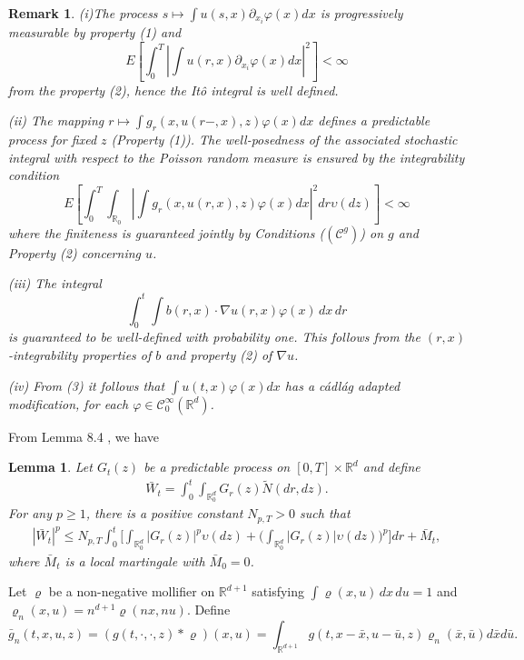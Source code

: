 \documentclass[12pt,oneside, reqno]{amsart}
\newcommand{\ce}{\begin{eqnarray*}}
\newcommand{\de}{\end{eqnarray*}}
\newtheorem{lemma}[theorem]{Lemma}
\newtheorem{remark}[theorem]{Remark}
\def\cC{{\mathcal C}}
\def\mR{{\mathbb R}}
\def\geq{\geqslant}
\def\leq{\leqslant}
\numberwithin{equation}{section}
\begin{document}
\begin{remark}
	(i)The process $s\mapsto \int u(s,x) \partial _{x_i} \varphi(x) dx$ is progressively measurable by property (1) and
	$$E\left[\int_0^T\left| \int u(r,x) \partial _{x_i} \varphi(x) dx\right|^2\right]<\infty$$
	from the property (2), hence the It\^{o} integral is well defined.
	
	(ii) The mapping $r\mapsto\int g_{r}(x,u(r-,x),z)\varphi(x)dx$ defines a predictable process for fixed $z$ (Property (1)). The well-posedness of the associated stochastic integral with respect to the Poisson random measure is ensured by the integrability condition
	$$E\left[\int_0^T\int_{\mR_0} \left| \int g_{r}(x,u(r,x),z)\varphi(x)dx\right|^2 dr \upsilon(dz)\right]<\infty$$
	where the finiteness is guaranteed jointly by Conditions ($(\mathcal C^g)$) on $g$ and Property (2) concerning $u$.
	
	(iii) The integral $$\int_0^t \int b(r,x) \cdot \nabla u(r,x) \varphi(x) \, dx\,dr$$ is guaranteed to be well-defined with probability one. This follows from the $(r,x)$-integrability properties of $b$ and property (2) of $\nabla u$.
	
	(iv) From (3) it follows that $\int u(t,x) \varphi(x)dx$ has a c\'{a}dl\'{a}g adapted modification, for each $\varphi\in \cC_0^\infty(\mR^d)$. 
\end{remark}






From Lemma 8.4 \cite{zz2026}, we have 

\begin{lemma}\label{power-estimete1}
	Let $G_t(z)$ be a predictable process on $[0,T]\times\mR^d$ and define
	\ce 
	\bar{W}_t=\int_0^t\int_{\mR_0^d}G_r(z)\tilde{N}(dr,dz).
	\de 
	For any $p\geq 1$, there is a positive constant $N_{p,T}>0$ such that 
	\ce
	|\bar{W}_t|^{p}\leq N_{p,T}\int_0^t\bigg[\int_{\mR_0^d}|G_r(z)|^{p}\upsilon(dz)+\bigg(\int_{\mR_0^d}|G_r(z)|\upsilon(dz)\bigg)^{p}\bigg]dr+\bar{M}_t,
	\de 
	where $\bar{M}_t$ is a local martingale with $\bar{M}_0=0$.
\end{lemma}

Let $\varrho$ be a non-negative mollifier on $\mR^{d+1}$ satisfying $\int \varrho(x,u)\,dx\,du=1 $ and $\varrho_n(x,u)=n^{d+1}\varrho(nx,nu)$. Define $$\bar{g}_n(t,x,u,z)=(g(t,\cdot,\cdot,z)*\varrho)(x,u)=\int_{\mR^{d+1}}g(t,x-\bar{x},u-\bar{u},z)\varrho_n(\bar{x},\bar{u})d\bar{x}d\bar{u}.$$
\end{document}

